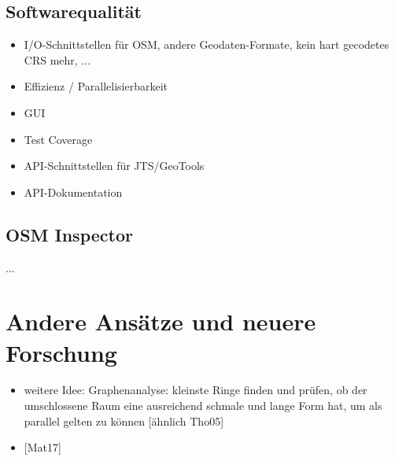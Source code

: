 \documentclass[../main/thesis.tex]{subfiles}
\begin{document}



\subsection{Softwarequalität}

\begin{itemize}
\item I/O-Schnittstellen für OSM, andere Geodaten-Formate, kein hart gecodetes CRS mehr, ...
\item Effizienz / Parallelisierbarkeit
\item GUI
\item Test Coverage
\item API-Schnittstellen für JTS/GeoTools
\item API-Dokumentation
\end{itemize}




\subsection{OSM Inspector}

...



\section{Andere Ansätze und neuere Forschung}

\begin{itemize}
\item weitere Idee: Graphenanalyse: kleinste Ringe finden und prüfen, ob der umschlossene Raum eine ausreichend schmale und lange Form hat, um als parallel gelten zu können [ähnlich Tho05]
\item {[Mat17]}
\end{itemize}




\end{document}

